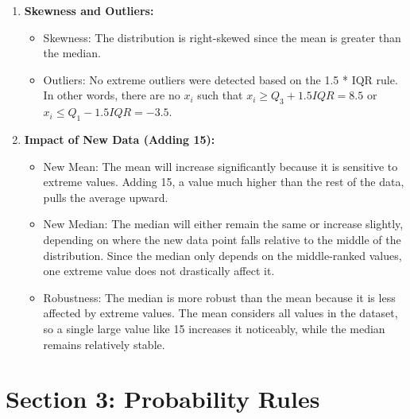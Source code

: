 \documentclass{article}
\begin{document}
\begin{enumerate}
\begin{itemize}
\end{itemize}

\item \textbf{Skewness and Outliers:}
\begin{itemize}
    \item Skewness: The distribution is right-skewed since the mean is greater than the median.
    \item Outliers: No extreme outliers were detected based on the 1.5 * IQR rule. In other words, there are no $x_i$ such that $x_i\geq Q_3+1.5IQR = 8.5$ or $x_i\leq Q_1 - 1.5IQR = -3.5$.
\end{itemize}

\item \textbf{Impact of New Data (Adding 15):}
\begin{itemize}
    \item New Mean: The mean will increase significantly because it is sensitive to extreme values. Adding 15, a value much higher than the rest of the data, pulls the average upward.
    \item New Median: The median will either remain the same or increase slightly, depending on where the new data point falls relative to the middle of the distribution. Since the median only depends on the middle-ranked values, one extreme value does not drastically affect it.
    \item Robustness: The median is more robust than the mean because it is less affected by extreme values. The mean considers all values in the dataset, so a single large value like 15 increases it noticeably, while the median remains relatively stable.
\end{itemize}

\end{enumerate}

\section*{Section 3: Probability Rules}
\end{document}
